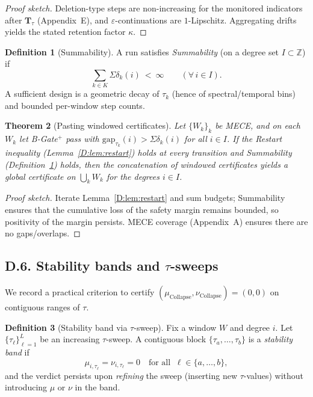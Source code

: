 \documentclass[11pt]{article}
\DeclareRobustCommand{\hyp}{\nobreakdash-}
\numberwithin{equation}{section}
\newtheorem{theorem}{Theorem}[section]
\theoremstyle{definition}
\newtheorem{definition}[theorem]{Definition}
\DeclareRobustCommand{\muc}{\mu_{\mathrm{Collapse}}}
\DeclareRobustCommand{\nuc}{\nu_{\mathrm{Collapse}}}
\begin{document}
\begin{proof}[Proof sketch]
Deletion-type steps are non\hyp increasing for the monitored indicators after \(\mathbf{T}_\tau\) (Appendix~E), and \(\varepsilon\)\hyp continuations are \(1\)\hyp Lipschitz. Aggregating drifts yields the stated retention factor \(\kappa\).
\end{proof}

\begin{definition}[Summability]\label{D:def:summability}
A run satisfies \emph{Summability} (on a degree set \(I\subset\mathbb{Z}\)) if
\[
\sum_{k\in K}\Sigma\delta_k(i)\ <\ \infty\qquad(\forall\,i\in I).
\]
A sufficient design is a geometric decay of \(\tau_k\) (hence of spectral/temporal bins) and bounded per\hyp window step counts.
\end{definition}

\begin{theorem}[Pasting windowed certificates]\label{D:thm:pasting}
Let \(\{W_k\}_k\) be MECE, and on each \(W_k\) let B\hyp Gate\(^{+}\) pass with \(\mathrm{gap}_{\tau_k}(i)>\Sigma\delta_k(i)\) for all \(i\in I\). If the Restart inequality (Lemma~\ref{D:lem:restart}) holds at every transition and Summability (Definition~\ref{D:def:summability}) holds, then the concatenation of windowed certificates yields a global certificate on \(\bigcup_k W_k\) for the degrees \(i\in I\).
\end{theorem}

\begin{proof}[Proof sketch]
Iterate Lemma~\ref{D:lem:restart} and sum budgets; Summability ensures that the cumulative loss of the safety margin remains bounded, so positivity of the margin persists. MECE coverage (Appendix~A) ensures there are no gaps/overlaps.
\end{proof}

\subsection*{D.6. Stability bands and \texorpdfstring{$\tau$}{tau}-sweeps}

We record a practical criterion to certify \((\muc,\nuc)=(0,0)\) on contiguous ranges of \(\tau\).

\begin{definition}[Stability band via \(\tau\)-sweep]\label{D:def:stab-band}
Fix a window \(W\) and degree \(i\). Let \(\{\tau_\ell\}_{\ell=1}^L\) be an increasing \(\tau\)-sweep. A contiguous block \(\{\tau_a,\dots,\tau_b\}\) is a \emph{stability band} if
\[
\mu_{i,\tau_\ell}=\nu_{i,\tau_\ell}=0\quad\text{for all }\ \ell\in\{a,\dots,b\},
\]
and the verdict persists upon \emph{refining} the sweep (inserting new \(\tau\)-values) without introducing \(\mu\) or \(\nu\) in the band.
\end{definition}
\end{document}
